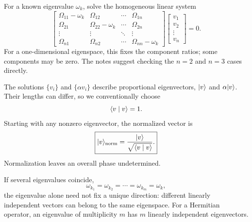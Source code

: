 For a known eigenvalue $\omega_k$, solve the homogeneous linear system
\[
 \begin{bmatrix}
 \Omega_{11}-\omega_k&\Omega_{12}&\cdots&\Omega_{1n}\\
 \Omega_{21}&\Omega_{22}-\omega_k&\cdots&\Omega_{2n}\\
 \vdots&\vdots&\ddots&\vdots\\
 \Omega_{n1}&\Omega_{n2}&\cdots&\Omega_{nn}-\omega_k
 \end{bmatrix}
 \begin{bmatrix}v_1\\v_2\\\vdots\\v_n\end{bmatrix}=0.
\]
For a one-dimensional eigenspace, this fixes the component ratios;
some components may be zero. The notes suggest checking the $n=2$
and $n=3$ cases directly.

The solutions $\{v_i\}$ and $\{\alpha v_i\}$ describe proportional
eigenvectors, $\lvert v\rangle$ and $\alpha\lvert v\rangle$. Their lengths can differ,
so we conventionally choose
\[
 \langle v\mid v\rangle=1.
\]
Starting with any nonzero eigenvector, the normalized vector is
\[
 \boxed{\lvert v\rangle_{\mathrm{norm}}
       =\frac{\lvert v\rangle}{\sqrt{\langle v\mid v\rangle}}.}
\]
Normalization leaves an overall phase undetermined.

If several eigenvalues coincide,
\[
 \omega_{k_1}=\omega_{k_2}=\cdots=\omega_{k_m}=\omega_k,
\]
the eigenvalue alone need not fix a unique direction: different
linearly independent vectors can belong to the same eigenspace.
For a Hermitian operator, an eigenvalue of multiplicity $m$ has
$m$ linearly independent eigenvectors.
